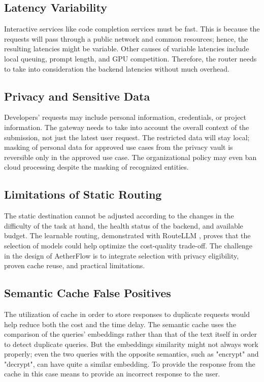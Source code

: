 \documentclass{FastFyp}
\begin{document}
\subsection{Latency Variability}
Interactive services like code completion services must be fast. This is because the requests will pass through a public network and common resources; hence, the resulting latencies might be variable. Other causes of variable latencies include local queuing, prompt length, and GPU competition. Therefore, the router needs to take into consideration the backend latencies without much overhead.

\subsection{Privacy and Sensitive Data}
Developers' requests may include personal information, credentials, or project information. The gateway needs to take into account the overall context of the submission, not just the latest user request. The restricted data will stay local; masking of personal data for approved use cases from the privacy vault is reversible only in the approved use case. The organizational policy may even ban cloud processing despite the masking of recognized entities.

\subsection{Limitations of Static Routing}
The static destination cannot be adjusted according to the changes in the difficulty of the task at hand, the health status of the backend, and available budget. The learnable routing, demonstrated with RouteLLM \cite{ref:RouteLLM}, proves that the selection of models could help optimize the cost-quality trade-off. The challenge in the design of AetherFlow is to integrate selection with privacy eligibility, proven cache reuse, and practical limitations.

\subsection{Semantic Cache False Positives}
The utilization of cache in order to store responses to duplicate requests would help reduce both the cost and the time delay. The semantic cache \cite{ref:GPTCache} uses the comparison of the queries' embeddings rather than that of the text itself in order to detect duplicate queries. But the embeddings similarity might not always work properly; even the two queries with the opposite semantics, such as "encrypt" and "decrypt", can have quite a similar embedding. To provide the response from the cache in this case means to provide an incorrect response to the user.
\end{document}
